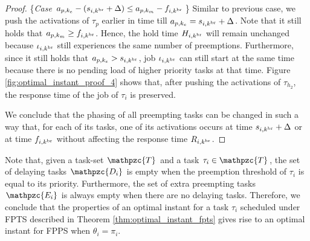 \begin{proof}
	\{\textit{Case} $a_{p,k_e}-(s_{i,k^{\rm{br}}} + \Delta) \leq a_{p,k_m}-f_{i,k^{\rm{br}}}$\} Similar to previous case, we push the activations of $\tau_p$ earlier in time till $a_{p,k_e} = s_{i,k^{\rm{br}}}+\Delta$. Note that it still holds that $a_{p,k_m} \geq f_{i,k^{\rm{br}}}$. Hence, the hold time $H_{i,k^{\rm{br}}}$ will remain unchanged because $\iota_{i,k^{\rm{br}}}$ still experiences the same number of preemptions. Furthermore, since it still holds that $a_{p,k_e} > s_{i,k^{\rm{br}}}$, job $\iota_{i,k^{\rm{br}}}$ can still start at the same time because there is no pending load of higher priority tasks at that time. Figure \ref{fig:optimal_instant_proof_4} shows that, after pushing the activations of $\tau_{h_2}$, the response time of the job of $\tau_i$ is preserved.
	
	We conclude that the phasing of all preempting tasks can be changed in such a way that, for each of its tasks, one of its activations occurs at time $s_{i,k^{\rm{br}}} + \Delta$ or at time $ f_{i,k^{\rm{br}}} $ without affecting the response time $R_{i,k^{\rm{br}}}$.
	\fi
\end{proof}

Note that, given a task-set $\mathpzc{T}$ and a task $\tau_i \in \mathpzc{T}$, the set of {delaying} tasks $\mathpzc{D_i}$ is empty when the preemption threshold of $\tau_i$ is equal to its priority. Furthermore, the set of extra preempting tasks $\mathpzc{E_i}$ is always empty when there are no delaying tasks. Therefore, we conclude that the properties of an optimal instant for a task $\tau_i$ scheduled under FPTS described in Theorem \ref{thm:optimal_instant_fpts} gives rise to an optimal instant for FPPS when $\theta_i = \pi_i$. 

